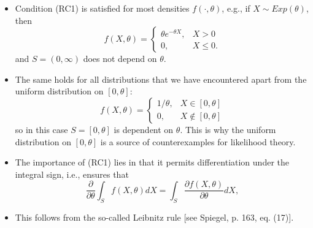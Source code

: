 \documentclass[notes=show]{beamer}
\begin{document}
\begin{frame}%


\begin{itemize}
\item Condition (RC1) is satisfied for most densities $f\left( \cdot ,\theta
\right) $, e.g., if $X\sim Exp\left( \theta \right) $, then 
\begin{equation*}
f\left( X,\theta \right) =\left\{ 
\begin{array}{ll}
\theta e^{-\theta X}, & X>0 \\ 
0, & X\leq 0.%
\end{array}%
\right.
\end{equation*}%
and $S=\left( 0,\infty \right) $ does not depend on $\theta $.

\item The same holds for all distributions that we have encountered apart
from the uniform distribution on $\left[ 0,\theta \right] $:%
\begin{equation*}
f\left( X,\theta \right) =\left\{ 
\begin{array}{ll}
1/\theta , & X\in \left[ 0,\theta \right] \\ 
0, & X\notin \left[ 0,\theta \right]%
\end{array}%
\right.
\end{equation*}%
so in this case $S=\left[ 0,\theta \right] $ is dependent on $\theta $. This
is why the uniform distribution on $\left[ 0,\theta \right] $ is a source of
counterexamples for likelihood theory.
\end{itemize}

\end{frame}%

\begin{frame}%


\begin{itemize}
\item The importance of (RC1) lies in that it permits differentiation under
the integral sign, i.e., ensures that%
\begin{equation}
\frac{\partial }{\partial \theta }\int_{S}f\left( X,\theta \right)
dX=\int_{S}\frac{\partial f\left( X,\theta \right) }{\partial \theta }dX,
\label{2.13}
\end{equation}

\item This follows from the so-called Leibnitz rule [see Spiegel, p. 163,
eq. (17)].
\end{itemize}

\end{frame}%
\end{document}
